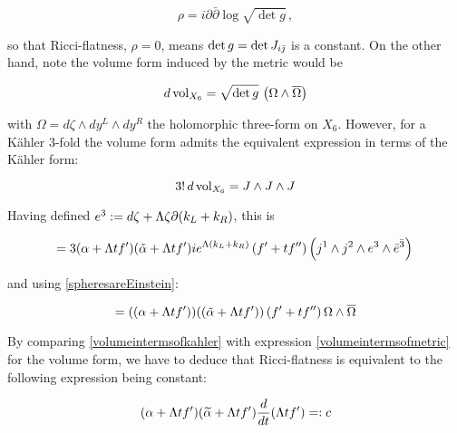 \begin{equation}
	\rho = i \partial \bar\partial \log \sqrt{ \det g}\,,
	\label{}
\end{equation}

so that Ricci-flatness, $\rho = 0$, means $\det g = \det {J_{i\bar{\jmath}}}$ is a constant. On the other hand, note the volume form induced by the metric would be

\begin{equation}
	d\operatorname{vol}_{X_6} = \sqrt{\det g}\, \left(\Omega \wedge \overline \Omega\right)
	\label{volumeintermsofmetric}
\end{equation}

with $\Omega = d\zeta \wedge dy^L \wedge dy^R$ the holomorphic three-form on $X_6$. However, for a K\"ahler $3$-fold the volume form admits the equivalent expression in terms of the K\"ahler form:

\begin{equation}
	3! \, d\operatorname{vol}_{X_6} = J\wedge J \wedge J 	\label{}
\end{equation}

Having defined $e^3 := d\zeta + \Lambda \zeta \partial (k_L + k_R)$, this is

\begin{equation}
	= 3 (\alpha + \Lambda t f') (\tilde\alpha + \Lambda t f') i e^{\Lambda(k_L + k_R)} \left(f'+tf''\right) \left(j^1 \wedge j^2 \wedge e^3 \wedge \bar e^{\bar 3} \right)\,
	\label{}
\end{equation}

and using \eqref{spheresareEinstein}:

\begin{equation}
	= ((\alpha + \Lambda t f'))((\tilde\alpha + \Lambda t f')) \left( f' +tf'' \right) \Omega \wedge \overline \Omega
	\label{volumeintermsofkahler}
\end{equation}

By comparing \eqref{volumeintermsofkahler} with expression \eqref{volumeintermsofmetric} for the volume form, we have to deduce that Ricci-flatness is equivalent to the following expression being constant:


\begin{equation}
	(\alpha + \Lambda t f')(\widetilde{\alpha} + \Lambda t f') \frac{d}{dt} (\Lambda t f') =: c 
\end{equation}

